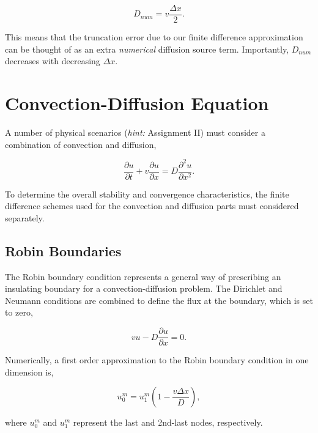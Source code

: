 \documentclass[12pt]{article}
\begin{document}
\vspace{2mm}

$$ D_{num} = v \frac{\Delta x}{2}. $$

\vspace{4mm}

This means that the truncation error due to our finite difference approximation can be thought of as an extra {\it numerical} diffusion source term. Importantly, $D_{num}$ decreases with decreasing $\Delta x$.


\section{Convection-Diffusion Equation}

A number of physical scenarios ({\it hint:} Assignment II) must consider a combination of convection and diffusion,

\vspace{2mm}

$$ \frac{\partial u}{\partial t} + v \frac{\partial u}{\partial x} = D\frac{\partial^2 u}{\partial x^2}. $$

\vspace{4mm}

To determine the overall stability and convergence characteristics, the finite difference schemes used for the convection and diffusion parts must considered separately.

\subsection{Robin Boundaries}

The Robin boundary condition represents a general way of prescribing an insulating boundary for a convection-diffusion problem. The Dirichlet and Neumann conditions are combined to define the flux at the boundary, which is set to zero,

\vspace{2mm}

$$ vu - D\frac{\partial u}{\partial x} = 0. $$

\vspace{4mm}

Numerically, a first order approximation to the Robin boundary condition in one dimension is,

\vspace{2mm}

$$ u_0^m = u_1^m\left(1-\frac{v\Delta x}{D}\right), $$

\vspace{4mm}

where $u_0^m$ and $u_1^m$ represent the last and 2nd-last nodes, respectively.
\end{document}
